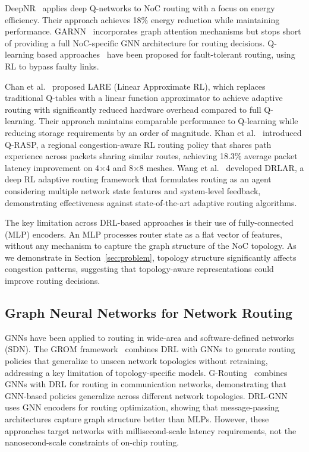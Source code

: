 DeepNR~\cite{deepnr2022} applies deep Q-networks to NoC routing with a focus on energy efficiency. Their approach achieves 18\% energy reduction while maintaining performance. GARNN~\cite{garnn2023} incorporates graph attention mechanisms but stops short of providing a full NoC-specific GNN architecture for routing decisions. Q-learning based approaches~\cite{choudhary2026} have been proposed for fault-tolerant routing, using RL to bypass faulty links.

Chan et al.~\cite{chan2023lare} proposed LARE (Linear Approximate RL), which replaces traditional Q-tables with a linear function approximator to achieve adaptive routing with significantly reduced hardware overhead compared to full Q-learning. Their approach maintains comparable performance to Q-learning while reducing storage requirements by an order of magnitude. Khan et al.~\cite{khan2023qrasp} introduced Q-RASP, a regional congestion-aware RL routing policy that shares path experience across packets sharing similar routes, achieving 18.3\% average packet latency improvement on 4$\times$4 and 8$\times$8 meshes. Wang et al.~\cite{wang2024drlar} developed DRLAR, a deep RL adaptive routing framework that formulates routing as an agent considering multiple network state features and system-level feedback, demonstrating effectiveness against state-of-the-art adaptive routing algorithms.

The key limitation across DRL-based approaches is their use of fully-connected (MLP) encoders. An MLP processes router state as a flat vector of features, without any mechanism to capture the graph structure of the NoC topology. As we demonstrate in Section~\ref{sec:problem}, topology structure significantly affects congestion patterns, suggesting that topology-aware representations could improve routing decisions.

\subsection{Graph Neural Networks for Network Routing}

GNNs have been applied to routing in wide-area and software-defined networks (SDN). The GROM framework~\cite{grom2024} combines DRL with GNNs to generate routing policies that generalize to unseen network topologies without retraining, addressing a key limitation of topology-specific models. G-Routing~\cite{g-routing2023} combines GNNs with DRL for routing in communication networks, demonstrating that GNN-based policies generalize across different network topologies. DRL-GNN~\cite{drl-gnn2019} uses GNN encoders for routing optimization, showing that message-passing architectures capture graph structure better than MLPs. However, these approaches target networks with millisecond-scale latency requirements, not the nanosecond-scale constraints of on-chip routing.


